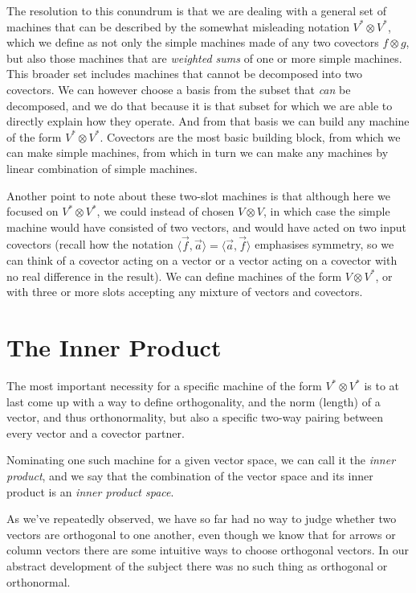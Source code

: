 The resolution to this conundrum is that we are dealing with a general set of machines that can be described by the somewhat misleading notation $V^* \otimes V^*$, which we define as not only the simple machines made of any two covectors $f \otimes g$, but also those machines that are \textit{weighted sums} of one or more simple machines. This broader set includes machines that cannot be decomposed into two covectors. We can however choose a basis from the subset that \textit{can} be decomposed, and we do that because it is that subset for which we are able to directly explain how they operate. And from that basis we can build any machine of the form $V^* \otimes V^*$. Covectors are the most basic building block, from which we can make simple machines, from which in turn we can make any machines by linear combination of simple machines.

Another point to note about these two-slot machines is that although here we focused on $V^* \otimes V^*$, we could instead of chosen $V \otimes V$, in which case the simple machine would have consisted of two vectors, and would have acted on two input covectors (recall how the notation $\langle \vec{f}, \vec{a} \rangle = \langle \vec{a}, \vec{f} \rangle$ emphasises symmetry, so we can think of a covector acting on a vector or a vector acting on a covector with no real difference in the result). We can define machines of the form $V \otimes V^*$, or with three or more slots accepting any mixture of vectors and covectors.

\section{The Inner Product}

The most important necessity for a specific machine of the form $V^* \otimes V^*$ is to at last come up with a way to define orthogonality, and the norm (length) of a vector, and thus orthonormality, but also a specific two-way pairing between every vector and a covector partner.

Nominating one such machine for a given vector space, we can call it the \textit{inner product}, and we say that the combination of the vector space and its inner product is an \textit{inner product space}.

As we've repeatedly observed, we have so far had no way to judge whether two vectors are orthogonal to one another, even though we know that for arrows or column vectors there are some intuitive ways to choose orthogonal vectors. In our abstract development of the subject there was no such thing as orthogonal or orthonormal.

